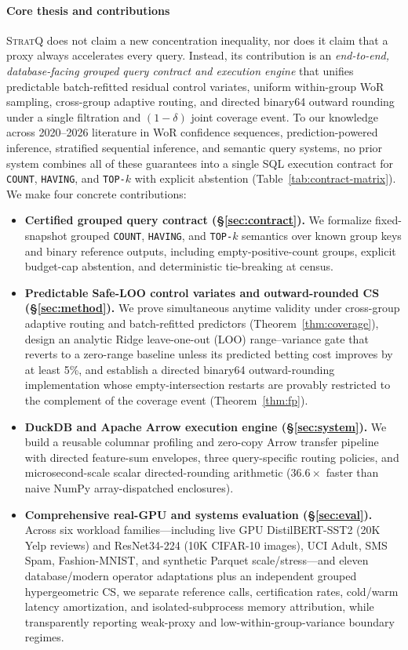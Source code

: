 \paragraph{Core thesis and contributions}
\textsc{StratQ} does not claim a new concentration inequality, nor does it claim that a proxy always accelerates every query.
Instead, its contribution is an \emph{end-to-end, database-facing grouped query contract and execution engine} that unifies predictable batch-refitted residual control variates, uniform within-group WoR sampling, cross-group adaptive routing, and directed binary64 outward rounding under a single filtration and $(1-\delta)$ joint coverage event.
To our knowledge across 2020--2026 literature in WoR confidence sequences, prediction-powered inference, stratified sequential inference, and semantic query systems, no prior system combines all of these guarantees into a single SQL execution contract for \texttt{COUNT}, \texttt{HAVING}, and \texttt{TOP-$k$} with explicit abstention (Table~\ref{tab:contract-matrix}).
We make four concrete contributions:
\begin{itemize}
  \item \textbf{Certified grouped query contract (\S\ref{sec:contract}).} We formalize fixed-snapshot grouped \texttt{COUNT}, \texttt{HAVING}, and \texttt{TOP-$k$} semantics over known group keys and binary reference outputs, including empty-positive-count groups, explicit budget-cap abstention, and deterministic tie-breaking at census.
  \item \textbf{Predictable Safe-LOO control variates and outward-rounded CS (\S\ref{sec:method}).} We prove simultaneous anytime validity under cross-group adaptive routing and batch-refitted predictors (Theorem~\ref{thm:coverage}), design an analytic Ridge leave-one-out (LOO) range--variance gate that reverts to a zero-range baseline unless its predicted betting cost improves by at least 5\%, and establish a directed binary64 outward-rounding implementation whose empty-intersection restarts are provably restricted to the complement of the coverage event (Theorem~\ref{thm:fp}).
  \item \textbf{DuckDB and Apache Arrow execution engine (\S\ref{sec:system}).} We build a reusable columnar profiling and zero-copy Arrow transfer pipeline with directed feature-sum envelopes, three query-specific routing policies, and microsecond-scale scalar directed-rounding arithmetic ($36.6\times$ faster than naive NumPy array-dispatched enclosures).
  \item \textbf{Comprehensive real-GPU and systems evaluation (\S\ref{sec:eval}).} Across six workload families---including live GPU DistilBERT-SST2 (20K Yelp reviews) and ResNet34-224 (10K CIFAR-10 images), UCI Adult, SMS Spam, Fashion-MNIST, and synthetic Parquet scale/stress---and eleven database/modern operator adaptations plus an independent grouped hypergeometric CS, we separate reference calls, certification rates, cold/warm latency amortization, and isolated-subprocess memory attribution, while transparently reporting weak-proxy and low-within-group-variance boundary regimes.
\end{itemize}


